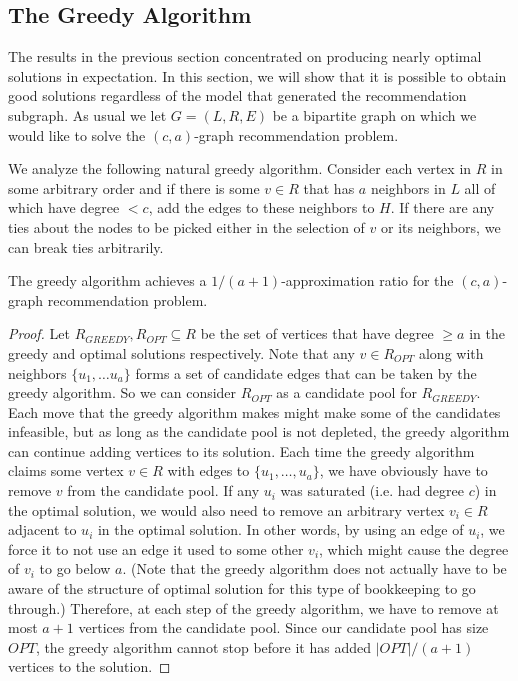 \subsection{The Greedy Algorithm}
\label{greedy}
The results in the previous section concentrated on producing nearly
optimal solutions in expectation. In this section, we will show that
it is possible to obtain good solutions regardless of the model that
generated the recommendation subgraph. As usual we let $G=(L,R,E)$ be a
bipartite graph on which we would like to solve the $(c,a)$-graph
recommendation problem. 

We analyze the following natural greedy algorithm. Consider each vertex in $R$ in some arbitrary order and if there is some $v \in R$ that has $a$ neighbors in $L$ all of which have degree $< c$, add the edges to these neighbors to $H$. If there
are any ties about the nodes to be picked either in the selection of
$v$ or its neighbors, we can break ties arbitrarily. 

\begin{thm}
The greedy algorithm achieves a $1/(a+1)$-approximation ratio for the $(c,a)$-graph
recommendation problem.
\end{thm}
\begin{proof}
Let $R_{GREEDY}, R_{OPT}\subseteq R$ be the set of vertices that have
degree $\geq a$ in the greedy and optimal solutions respectively. Note
that any $v \in R_{OPT}$ along with neighbors $\{u_1,\ldots u_a\}$
forms a set of candidate edges that can be taken by the greedy
algorithm. So we can consider $R_{OPT}$ as a candidate pool for
$R_{GREEDY}$. Each move that the greedy algorithm makes might make
some of the candidates infeasible, but as long as the candidate pool
is not depleted, the greedy algorithm can continue adding vertices to
its solution. Each time the greedy algorithm claims some vertex $v\in
R$ with edges to $\{u_1,\ldots, u_a\}$, we have obviously have to
remove $v$ from the candidate pool. If any $u_i$ was saturated
(i.e. had degree $c$) in the optimal solution, we would also need to
remove an arbitrary vertex $v_i\in R$ adjacent to $u_i$ in the optimal
solution. In other words, by using an edge of $u_i$, we force it to
not use an edge it used to some other $v_i$, which might cause the
degree of $v_i$ to go below $a$. (Note that the greedy algorithm does
not actually have to be aware of the structure of optimal solution for
this type of bookkeeping to go through.) Therefore, at each step of
the greedy algorithm, we have to remove at most $a+1$ vertices from
the candidate pool. Since our candidate pool has size $OPT$, the
greedy algorithm cannot stop before it has added $|OPT|/(a+1)$
vertices to the solution.
\end{proof}

